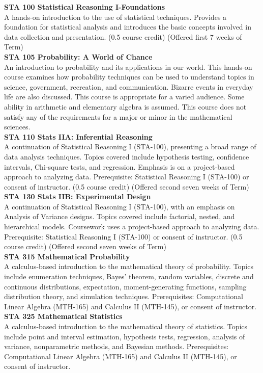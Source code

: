 \documentclass[
  letterpaper,
]{scrbook}
\begin{document}
\textbf{STA 100 Statistical Reasoning I-Foundations}\\
A hands-on introduction to the use of statistical techniques. Provides a
foundation for statistical analysis and introduces the basic concepts
involved in data collection and presentation. (0.5 course credit)
(Offered first 7 weeks of Term)\\
\textbf{STA 105 Probability: A World of Chance}\\
An introduction to probability and its applications in our world. This
hands-on course examines how probability techniques can be used to
understand topics in science, government, recreation, and communication.
Bizarre events in everyday life are also discussed. This course is
appropriate for a varied audience. Some ability in arithmetic and
elementary algebra is assumed. This course does not satisfy any of the
requirements for a major or minor in the mathematical sciences.\\
\textbf{STA 110 Stats IIA: Inferential Reasoning}\\
A continuation of Statistical Reasoning I (STA-100), presenting a broad
range of data analysis techniques. Topics covered include hypothesis
testing, confidence intervals, Chi-square tests, and regression.
Emphasis is on a project-based approach to analyzing data. Prerequisite:
Statistical Reasoning I (STA-100) or consent of instructor. (0.5 course
credit) (Offered second seven weeks of Term)\\
\textbf{STA 130 Stats IIB: Experimental Design}\\
A continuation of Statistical Reasoning I (STA-100), with an emphasis on
Analysis of Variance designs. Topics covered include factorial, nested,
and hierarchical models. Coursework uses a project-based approach to
analyzing data. Prerequisite: Statistical Reasoning I (STA-100) or
consent of instructor. (0.5 course credit) (Offered second seven weeks
of Term)\\
\textbf{STA 315 Mathematical Probability}\\
A calculus-based introduction to the mathematical theory of probability.
Topics include enumeration techniques, Bayes' theorem, random variables,
discrete and continuous distributions, expectation, moment-generating
functions, sampling distribution theory, and simulation techniques.
Prerequisites: Computational Linear Algebra (MTH-165) and Calculus II
(MTH-145), or consent of instructor.\\
\textbf{STA 325 Mathematical Statistics}\\
A calculus-based introduction to the mathematical theory of statistics.
Topics include point and interval estimation, hypothesis tests,
regression, analysis of variance, nonparametric methods, and Bayesian
methods. Prerequisites: Computational Linear Algebra (MTH-165) and
Calculus II (MTH-145), or consent of instructor.
\end{document}

